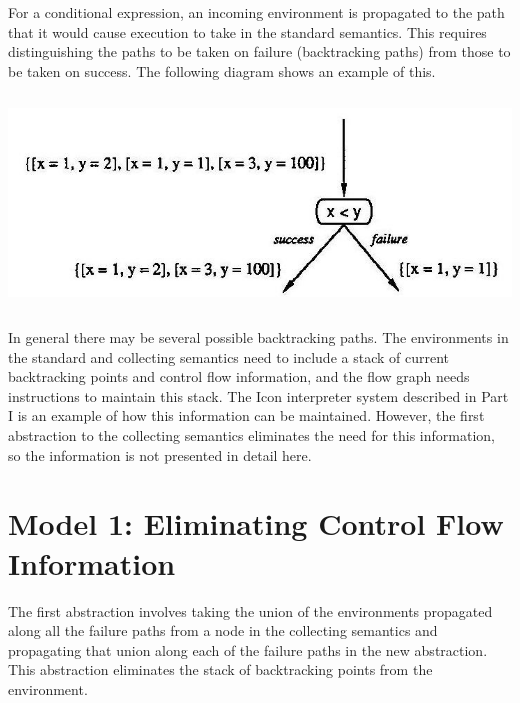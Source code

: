 For a conditional expression, an incoming environment is propagated to
the path that it would cause execution to take in the standard
semantics. This requires distinguishing the paths to be taken on
failure (backtracking paths) from those to be taken on success. The
following diagram shows an example of this.

{\centering  \includegraphics[width=5.3992in,height=2.2299in]{kw/figure3-6.png} \par}

In general there may be several possible backtracking paths. The
environments in the standard and collecting semantics need to include
a stack of current backtracking points and control flow information,
and the flow graph needs instructions to maintain this stack. The Icon
interpreter system described in Part I is an example of how this
information can be maintained. However, the first abstraction to the
collecting semantics eliminates the need for this information, so the
information is not presented in detail here.

\section{Model 1: Eliminating Control Flow Information}

The first abstraction involves taking the union of the environments
propagated along all the failure paths from a node in the collecting
semantics and propagating that union along each of the failure paths
in the new abstraction. This abstraction eliminates the stack of
backtracking points from the environment.

